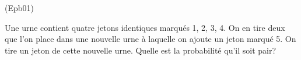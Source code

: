 \begin{tiny}(Epb01)\end{tiny} Une urne contient quatre jetons identiques marqués 1, 2, 3, 4. On en tire deux que l'on place dans une nouvelle urne à laquelle on ajoute un jeton marqué 5. On tire un jeton de cette nouvelle urne. Quelle est la probabilité qu'il soit pair?